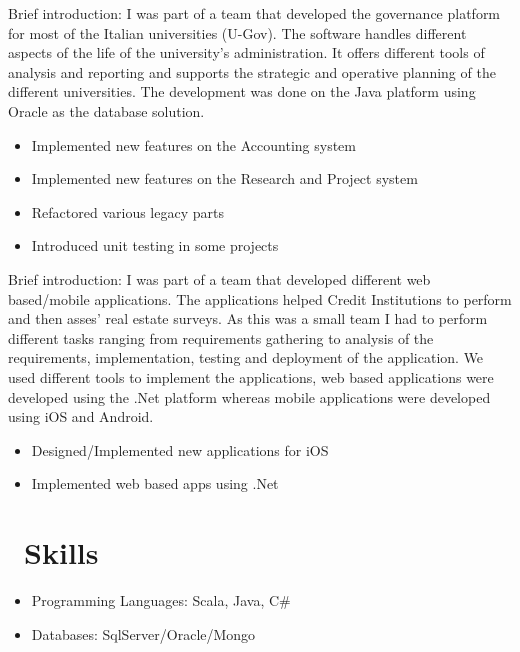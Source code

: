 \documentclass{resume}
\begin{document}
Brief introduction:
I was part of a team that developed the governance platform for most of the Italian universities (U-Gov).
The software handles different aspects of the life of the university's administration. It offers different tools of analysis and reporting and supports the strategic and operative planning of the different universities.
The development was done on the Java platform using Oracle as the database solution.

\begin{itemize}
  \item Implemented new features on the Accounting system
  \item Implemented new features on the Research and Project system
  \item Refactored various legacy parts
  \item Introduced unit testing in some projects
\end{itemize}

Brief introduction: I was part of a team that developed different web based/mobile applications.
The applications helped Credit Institutions to perform and then asses’ real estate surveys.
As this was a small team I had to perform different tasks ranging from requirements gathering to analysis of the requirements, implementation, testing and deployment of the application.
We used different tools to implement the applications, web based applications were developed using the .Net platform whereas mobile applications were developed using iOS and Android.

\begin{itemize}
  \item Designed/Implemented new applications for iOS
  \item Implemented web based apps using .Net
\end{itemize}


\section{\faCogs\ Skills}
\begin{itemize}[parsep=0.5ex]
  \item Programming Languages: Scala, Java, C\#
  \item Databases: SqlServer/Oracle/Mongo
\end{itemize}
\end{document}
